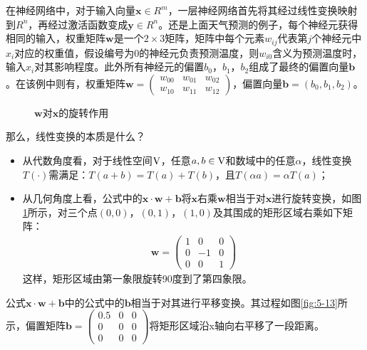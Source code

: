 \parinterval 在神经网络中，对于输入向量$ \mathbf x\in R^m $，一层神经网络首先将其经过线性变换映射到$ R^n $，再经过激活函数变成$  \mathbf y\in R^n $。还是上面天气预测的例子，每个神经元获得相同的输入，权重矩阵$ \mathbf w $是一个$ 2\times 3 $矩阵，矩阵中每个元素$ w_{ij} $代表第$ j $个神经元中$ x_{i} $对应的权重值，假设编号为0的神经元负责预测温度，则$ w_{i0} $含义为预测温度时，输入$ x_{i} $对其影响程度。此外所有神经元的偏置$ b_{0} $，$ b_{1} $，$ b_{2} $组成了最终的偏置向量$ \mathbf b $。在该例中则有，权重矩阵$ \mathbf w=\begin{pmatrix} w_{00} & w_{01} & w_{02}\\ w_{10} & w_{11} & w_{12}\end{pmatrix} $，偏置向量$ \mathbf b=(b_0,b_1,b_2) $。

\begin{figure}[htp]
\centering

\caption{ $ \mathbf w $对$ \mathbf x $的旋转作用}
\label{fig:5-12}
\end{figure}

\parinterval 那么，线性变换的本质是什么？

\begin{itemize}
\vspace{0.5em}
\item 从代数角度看，对于线性空间$ \rm V $，任意$ a,b\in {\rm V} $和数域中的任意$ \alpha $，线性变换$ T(\cdot) $需满足：$ T(a+b)=T(a)+T(b) $，且$ T(\alpha a)=\alpha T(a) $；
\vspace{0.5em}
\item 从几何角度上看，公式中的$ \mathbf x\cdot \mathbf w+\mathbf b $将$ \mathbf x $右乘$ \mathbf w $相当于对$ \mathbf x $进行旋转变换，如图\ref{fig:5-12}所示，对三个点$ (0,0) $，$ (0,1) $，$ (1,0) $及其围成的矩形区域右乘如下矩阵：
    \begin{eqnarray}
    \mathbf w=\begin{pmatrix} 1 & 0 & 0\\ 0 & -1 & 0\\ 0 & 0 & 1\end{pmatrix}
    \end{eqnarray}
    这样，矩形区域由第一象限旋转90度到了第四象限。
\vspace{0.5em}
\end{itemize}

\parinterval 公式$ \mathbf x\cdot \mathbf w+\mathbf b $中的公式中的$ \mathbf b $相当于对其进行平移变换。其过程如图\ref{fig:5-13}所示，偏置矩阵$ \mathbf b=\begin{pmatrix} 0.5 & 0 & 0\\ 0 & 0 & 0\\ 0 & 0 & 0\end{pmatrix} $将矩形区域沿x轴向右平移了一段距离。

